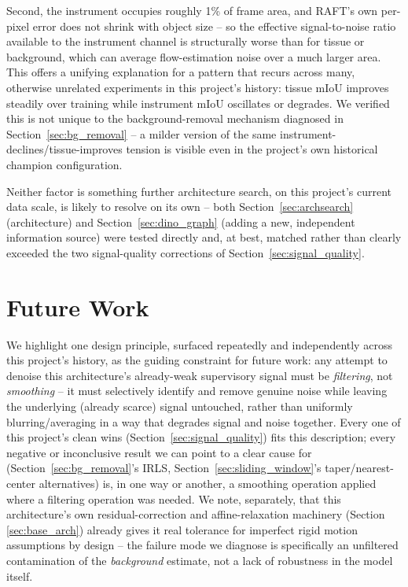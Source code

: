 \documentclass[conference]{IEEEtran}
\begin{document}
Second, the instrument occupies roughly 1\% of frame area, and RAFT's
own per-pixel error does not shrink with object size -- so the
effective signal-to-noise ratio available to the instrument channel is
structurally worse than for tissue or background, which can average
flow-estimation noise over a much larger area. This offers a unifying
explanation for a pattern that recurs across many, otherwise unrelated
experiments in this project's history: tissue mIoU improves steadily over
training while instrument mIoU oscillates or degrades. We verified this
is not unique to the background-removal mechanism diagnosed in
Section~\ref{sec:bg_removal} -- a milder version of the same
instrument-declines/tissue-improves tension is visible even in the
project's own historical champion configuration.

Neither factor is something further architecture search, on this
project's current data scale, is likely to resolve on its own -- both
Section~\ref{sec:archsearch} (architecture) and
Section~\ref{sec:dino_graph} (adding a new, independent information
source) were tested directly and, at best, matched rather than clearly
exceeded the two signal-quality corrections of
Section~\ref{sec:signal_quality}.

\section{Future Work}
\label{sec:future}

We highlight one design principle, surfaced repeatedly and independently
across this project's history, as the guiding constraint for future
work: any attempt to denoise this architecture's already-weak supervisory
signal must be \emph{filtering}, not \emph{smoothing} -- it must
selectively identify and remove genuine noise while leaving the
underlying (already scarce) signal untouched, rather than uniformly
blurring/averaging in a way that degrades signal and noise together.
Every one of this project's clean wins (Section~\ref{sec:signal_quality})
fits this description; every negative or inconclusive result we can point
to a clear cause for (Section~\ref{sec:bg_removal}'s IRLS,
Section~\ref{sec:sliding_window}'s taper/nearest-center alternatives) is,
in one way or another, a smoothing operation applied where a filtering
operation was needed. We note, separately, that this architecture's own
residual-correction and affine-relaxation machinery (Section
\ref{sec:base_arch}) already gives it real tolerance for imperfect rigid
motion assumptions by design -- the failure mode we diagnose is
specifically an unfiltered contamination of the \emph{background}
estimate, not a lack of robustness in the model itself.
\end{document}
